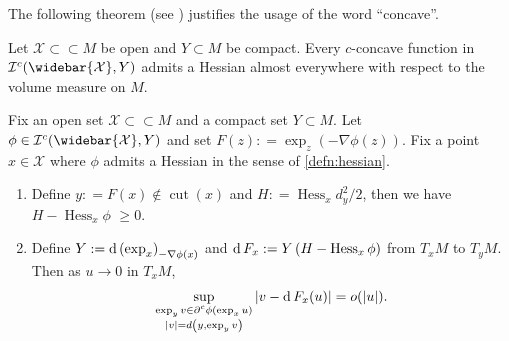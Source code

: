 The following theorem (see \cite[Proposition 3.4]{cordero2001riemannian}) justifies the usage of the word ``concave''.
\begin{thm}
	\label{thm:c-concave_hessain}
	Let $\mathcal{X} \subset \subset M$ be open and $Y \subset M$ be compact.
	Every $c$-concave function in $\mathcal{I}^c(\widebar { \mathcal{X}}, Y )$ admits a Hessian
	almost everywhere with respect to the volume measure on $M$.
\end{thm}

\begin{prop} 
	\label{prop:differentiate_optimal_transport}
	Fix an open set \( \mathcal{X} \subset \subset M \) and a compact set \( Y \subset M \).
	Let \( \phi \in \mathcal{I} ^ { c } ( \widebar { \mathcal{X} } , Y ) \) and set \( F ( z ) : = \exp _ { z } ( - \nabla \phi ( z ) ) . \)
	Fix a point \( x \in \mathcal{X} \) where \( \phi \) admits a Hessian in the sense of \cref{defn:hessian}.
	\begin{enumerate}
		\item Define \( y : = F ( x ) \notin \operatorname { cut } ( x ) \) and \( H : = \operatorname { Hess } _ { x } d _ { y } ^ { 2 } / 2 \), then we have \( H - \operatorname { Hess } _ { x } \phi \) \( \geq 0 \).
		\item Define \( Y : = \operatorname{d} \left( \exp _ { x } \right) _ { - \nabla \phi ( x ) } \) and
			\( \operatorname{d} F _ { x } : = Y \left( H - \operatorname { Hess } _ { x } \phi \right)\)
			from $T_x M$ to $T_y M$.
		      Then as \( u \rightarrow 0 \) in \( T _ { x } M \),
		      \begin{equation}
			      \label{equa:differentiate_optimal_transport}
			      \sup _ {\substack {\exp _ { y } v \in \partial ^ { c } \phi \left( \exp _ { x } u \right) \\
					      | v | = d \left( y , \exp _ { y } v \right)} } \left| v - \operatorname{d} F _ { x } ( u ) \right| = o ( | u | ).
		      \end{equation}

	\end{enumerate}
\end{prop}

